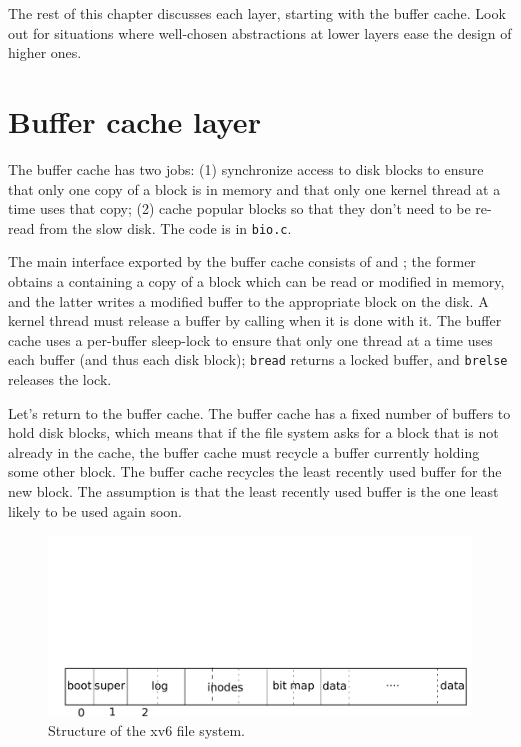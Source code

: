 The rest of this chapter discusses each layer, starting with the
buffer cache.
Look out for situations where well-chosen abstractions at lower layers
ease the design of higher ones.
\section{Buffer cache layer}

The buffer cache has two jobs: (1) synchronize access to disk blocks to ensure
that only one copy of a block is in memory and that only one kernel thread at a time
uses that copy; (2) cache popular blocks so that they don't need to be re-read from
the slow disk. The code is in
\lstinline{bio.c}.

The main interface exported by the buffer cache consists of
and
;
the former obtains a
containing a copy of a block which can be read or modified in memory, and the
latter writes a modified buffer to the appropriate block on the disk.
A kernel thread must release a buffer by calling
when it is done with it.
The buffer cache uses a per-buffer sleep-lock to ensure
that only one thread at a time uses each buffer
(and thus each disk block);
\lstinline{bread}
returns a locked buffer, and
\lstinline{brelse}
releases the lock.

Let's return to the buffer cache.
The buffer cache has a fixed number of buffers to hold disk blocks,
which means that if the file system asks for a block that is not
already in the cache, the buffer cache must recycle a buffer currently
holding some other block. The buffer cache recycles the
least recently used buffer for the new block. The assumption is that
the least recently used buffer is the one least likely to be used
again soon.

\begin{figure}[t]
\center
\includegraphics[scale=0.5]{fig/fslayout.pdf}
\caption{Structure of the xv6 file system. }
\label{fig:fslayout}
\end{figure}
